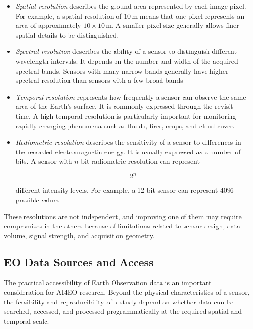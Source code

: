 \documentclass[11pt,a4paper]{article}
\begin{document}
\begin{itemize}
    \item \textit{Spatial resolution} describes the ground area represented
    by each image pixel. For example, a spatial resolution of
    \(10\,\mathrm{m}\) means that one pixel represents an area of
    approximately \(10 \times 10\,\mathrm{m}\). A smaller pixel size generally
    allows finer spatial details to be distinguished.

    \item \textit{Spectral resolution} describes the ability of a sensor to
    distinguish different wavelength intervals. It depends on the number
    and width of the acquired spectral bands. Sensors with many narrow
    bands generally have higher spectral resolution than sensors with a
    few broad bands.

    \item \textit{Temporal resolution} represents how frequently a sensor
    can observe the same area of the Earth's surface. It is commonly
    expressed through the revisit time. A high temporal resolution is
    particularly important for monitoring rapidly changing phenomena
    such as floods, fires, crops, and cloud cover.

    \item \textit{Radiometric resolution} describes the sensitivity of a
    sensor to differences in the recorded electromagnetic energy. It is
    usually expressed as a number of bits. A sensor with \(n\)-bit
    radiometric resolution can represent

    \[
    2^n
    \]

    different intensity levels. For example, a 12-bit sensor can
    represent \(4096\) possible values.
\end{itemize}

These resolutions are not independent, and improving one of them may
require compromises in the others because of limitations related to
sensor design, data volume, signal strength, and acquisition geometry.



\subsection{EO Data Sources and Access}

The practical accessibility of Earth Observation data is an important
consideration for AI4EO research. Beyond the physical characteristics of
a sensor, the feasibility and reproducibility of a study depend on
whether data can be searched, accessed, and processed programmatically
at the required spatial and temporal scale.
\end{document}
